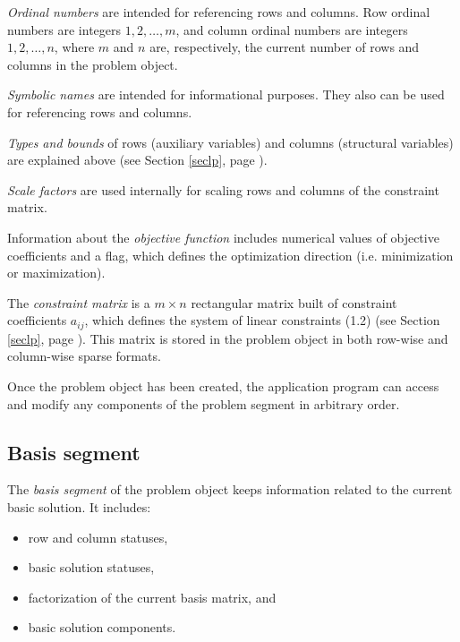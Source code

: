 \vspace*{-7pt}

{\it Ordinal numbers} are intended for referencing rows and columns.
Row ordinal numbers are integers $1, 2, \dots, m$, and column ordinal
numbers are integers $1, 2, \dots, n$, where $m$ and $n$ are,
respectively, the current number of rows and columns in the problem
object.

{\it Symbolic names} are intended for informational purposes. They also
can be used for referencing rows and columns.

{\it Types and bounds} of rows (auxiliary variables) and columns
(structural variables) are explained above (see Section \ref{seclp},
page \pageref{seclp}).

{\it Scale factors} are used internally for scaling rows and columns of
the constraint matrix.

Information about the {\it objective function} includes numerical
values of objective coefficients and a flag, which defines the
optimization direction (i.e. minimization or maximization).

The {\it constraint matrix} is a $m \times n$ rectangular matrix built
of constraint coefficients $a_{ij}$, which defines the system of linear
constraints (1.2) (see Section \ref{seclp}, page \pageref{seclp}). This
matrix is stored in the problem object in both row-wise and column-wise
sparse formats.

Once the problem object has been created, the application program can
access and modify any components of the problem segment in arbitrary
order.

\subsection{Basis segment}

The {\it basis segment} of the problem object keeps information related
to the current basic solution. It includes:

\vspace*{-8pt}

\begin{itemize}\setlength{\itemsep}{0pt}
\item row and column statuses,

\item basic solution statuses,

\item factorization of the current basis matrix, and

\item basic solution components.
\end{itemize}

